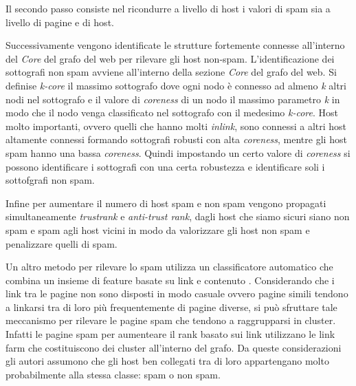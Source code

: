 Il secondo passo consiste nel ricondurre  a livello di host i valori di spam sia a livello di pagine e di host.

Successivamente vengono identificate le strutture fortemente connesse all'interno del \textit{Core} del grafo del web per rilevare gli host non-spam. L'identificazione dei sottografi non spam avviene all'interno della sezione \textit{Core} del grafo del web. Si definise \textit{k-core} il massimo sottografo dove ogni nodo è connesso ad almeno \textit{k} altri nodi nel sottografo e il valore di \textit{coreness} di un nodo il massimo parametro \textit{k} in modo che il nodo venga classificato nel sottografo con il medesimo \textit{k-core}. Host molto importanti, ovvero quelli che hanno molti \textit{inlink}, sono connessi a altri host altamente connessi formando sottografi robusti con alta \textit{coreness}, mentre gli host spam hanno una bassa \textit{coreness}. Quindi impostando un certo valore di \textit{coreness} si possono identificare i sottografi con una certa robustezza e identificare soli i sottofgrafi non spam.

Infine per aumentare il numero di host spam e non spam vengono propagati simultaneamente \textit{trustrank} e \textit{anti-trust rank}, dagli host che siamo sicuri siano non spam e spam agli host vicini in modo da valorizzare gli host non spam e penalizzare quelli di spam.

Un altro metodo per rilevare lo spam utilizza un classificatore automatico che combina un insieme di feature basate su link e contenuto \cite{Castillo:2007:KYN:1277741.1277814}. Considerando che i link tra le pagine non sono disposti in modo casuale ovvero pagine simili tendono a linkarsi tra di loro più frequentemente di pagine diverse, si può sfruttare tale meccanismo per rilevare le pagine spam che tendono a raggrupparsi in cluster. Infatti le pagine spam per aumenteare il rank basato sui link utilizzano le link farm che costituiscono dei cluster all'interno del grafo. Da queste considerazioni gli autori assumono che gli host ben collegati tra di loro appartengano molto probabilmente alla stessa classe: spam o non spam.

